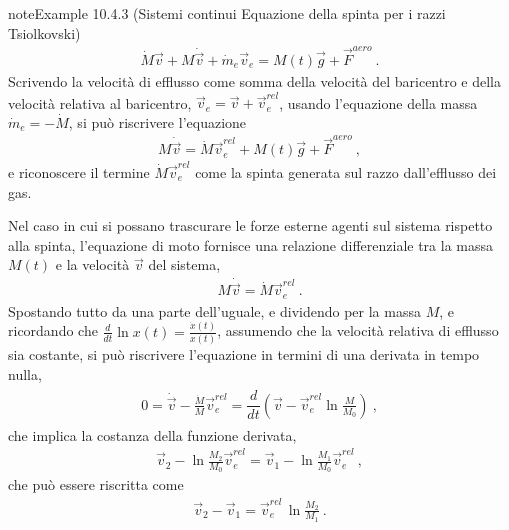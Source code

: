 \documentclass[letterpaper,10pt,italian]{jupyterBook}
\begin{document}
\begin{sphinxadmonition}{note}{Example 10.4.3 (Sistemi continui \sphinxhyphen{} Equazione della spinta per i razzi \sphinxhyphen{} Tsiolkovski)}
\begin{equation*}
\begin{split}\dot{M} \vec{v} + M \dot{\vec{v}} + \dot{m}_e \vec{v}_e = M(t) \vec{g} + \vec{F}^{aero} \ .\end{split}
\end{equation*}
\sphinxAtStartPar
Scrivendo la velocità di efflusso come somma della velocità del baricentro e della velocità relativa al baricentro, \(\vec{v}_e = \vec{v} + \vec{v}_e^{rel}\), usando l’equazione della massa \(\dot{m}_e = - \dot{M}\), si può riscrivere l’equazione
\begin{equation*}
\begin{split}M \dot{\vec{v}} = \dot{M} \vec{v}_e^{rel} + M(t) \vec{g} + \vec{F}^{aero} \ ,\end{split}
\end{equation*}
\sphinxAtStartPar
e riconoscere il termine \(\dot{M} \vec{v}_e^{rel}\) come la spinta generata sul razzo dall’efflusso dei gas.

\sphinxAtStartPar
Nel caso in cui si possano trascurare le forze esterne agenti sul sistema rispetto alla spinta, l’equazione di moto fornisce una relazione differenziale tra la massa \(M(t)\) e la velocità \(\vec{v}\) del sistema,
\begin{equation*}
\begin{split}M \dot{\vec{v}} = \dot{M} \vec{v}_e^{rel} \ .\end{split}
\end{equation*}
\sphinxAtStartPar
Spostando tutto da una parte dell’uguale, e dividendo per la massa \(M\), e ricordando che \(\frac{d}{dt} \ln x(t) = \frac{\dot{x}(t)}{x(t)}\), assumendo che la velocità relativa di efflusso sia costante, si può riscrivere l’equazione in termini di una derivata in tempo nulla,
\begin{equation*}
\begin{split}\begin{aligned}
  0 = \dot{\vec{v}} - \frac{\dot{M}}{M} \vec{v}_e^{rel} = \dfrac{d}{dt} \left( \vec{v} - \vec{v}^{rel}_e \ln \frac{M}{M_0} \right) \ ,
\end{aligned}\end{split}
\end{equation*}
\sphinxAtStartPar
che implica la costanza della funzione derivata,
\begin{equation*}
\begin{split}\vec{v}_2 - \ln \frac{M_2}{M_0} \vec{v}^{rel}_e = \vec{v}_1 - \ln \frac{M_1}{M_0} \vec{v}^{rel}_e \ ,\end{split}
\end{equation*}
\sphinxAtStartPar
che può essere riscritta come
\begin{equation*}
\begin{split}\vec{v}_2 - \vec{v}_1 =  \vec{v}^{rel}_e \, \ln \frac{M_2}{M_1}\ .\end{split}
\end{equation*}\end{sphinxadmonition}
\end{document}
